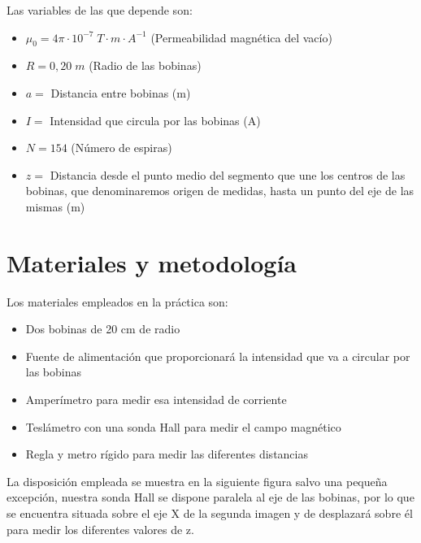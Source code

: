 \documentclass[a4paper,12pt,titlepage]{report}
\begin{document}
Las variables de las que depende son:

\begin{itemize}
    \item $\mu_{0} = 4\pi \cdot 10^{-7} \; T\cdot m \cdot A^{-1}$ (Permeabilidad magnética del vacío)
    \item $R= 0,20 \; m$ (Radio de las bobinas)
    \item $a =$ Distancia entre bobinas (m)
    \item $I=$ Intensidad que circula por las bobinas (A)
    \item $N=154$ (Número de espiras)
    \item $z=$ Distancia desde el punto medio del segmento que une los centros de las bobinas, que denominaremos origen de medidas, hasta un punto del eje de las mismas (m)
\end{itemize}


\section{Materiales y metodología}

Los materiales empleados en la práctica son:

\begin{itemize}
    \item Dos bobinas de 20 cm de radio
    \item Fuente de alimentación que proporcionará la intensidad que va a circular por las bobinas
    \item Amperímetro para medir esa intensidad de corriente
    \item Teslámetro con una sonda Hall para medir el campo magnético
    \item Regla y metro rígido para medir las diferentes distancias
\end{itemize}

La disposición empleada se muestra en la siguiente figura salvo una pequeña excepción, nuestra sonda Hall se dispone paralela al eje de las bobinas, por lo que se encuentra situada sobre el eje X de la segunda imagen y de desplazará sobre él para medir los diferentes valores de z.
\end{document}
